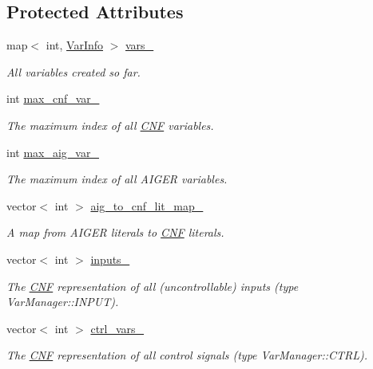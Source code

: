 \subsection*{Protected Attributes}
\begin{DoxyCompactItemize}
\item 
map$<$ int, \hyperlink{classVarInfo}{Var\-Info} $>$ \hyperlink{classVarManager_a22299c4735b0191e0f81048882692a45}{vars\-\_\-}
\begin{DoxyCompactList}\small\item\em All variables created so far. \end{DoxyCompactList}\item 
int \hyperlink{classVarManager_aa790c99974d2aa97ed1848e49c4c82c6}{max\-\_\-cnf\-\_\-var\-\_\-}
\begin{DoxyCompactList}\small\item\em The maximum index of all \hyperlink{classCNF}{C\-N\-F} variables. \end{DoxyCompactList}\item 
int \hyperlink{classVarManager_af5877424c2c4ef563bd3278f85dd3c2d}{max\-\_\-aig\-\_\-var\-\_\-}
\begin{DoxyCompactList}\small\item\em The maximum index of all A\-I\-G\-E\-R variables. \end{DoxyCompactList}\item 
vector$<$ int $>$ \hyperlink{classVarManager_abaa6d10a62f138bdc932a8e76c709849}{aig\-\_\-to\-\_\-cnf\-\_\-lit\-\_\-map\-\_\-}
\begin{DoxyCompactList}\small\item\em A map from A\-I\-G\-E\-R literals to \hyperlink{classCNF}{C\-N\-F} literals. \end{DoxyCompactList}\item 
vector$<$ int $>$ \hyperlink{classVarManager_a04609c1f6a3c87c10abcfbd3850a2f87}{inputs\-\_\-}
\begin{DoxyCompactList}\small\item\em The \hyperlink{classCNF}{C\-N\-F} representation of all (uncontrollable) inputs (type Var\-Manager\-::\-I\-N\-P\-U\-T). \end{DoxyCompactList}\item 
vector$<$ int $>$ \hyperlink{classVarManager_acb66edc1a4fc8ccc25321a59fe1668ff}{ctrl\-\_\-vars\-\_\-}
\begin{DoxyCompactList}\small\item\em The \hyperlink{classCNF}{C\-N\-F} representation of all control signals (type Var\-Manager\-::\-C\-T\-R\-L). \end{DoxyCompactList}\item 

\end{DoxyCompactItemize}
